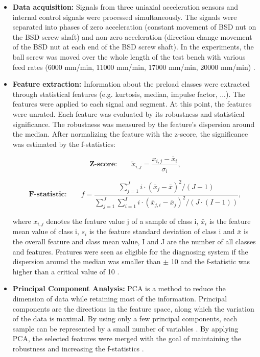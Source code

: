 \begin{itemize}
    \item \textbf{Data acquisition:} Signals from three uniaxial acceleration sensors and internal control signals were processed simultaneously. The signals were separated into phases of zero acceleration (constant movement of BSD nut on the BSD screw shaft) and non-zero acceleration (direction change movement of the BSD nut at each end of the BSD screw shaft). In the experiments, the ball screw was moved over the whole length of the test bench with various feed rates (6000 mm/min, 11000 mm/min, 17000 mm/min, 20000 mm/min) \cite{Denkena2021}.
    \item \textbf{Feature extraction:} Information about the preload classes were extracted through statistical features (e.g. kurtosis, median, impulse factor, ...). The features were applied to each signal and segment. At this point, the features were unrated. Each feature was evaluated by its robustness and statistical significance. The robustness was measured by the feature's dispersion around the median. After normalizing the feature with the z-score, the significance was estimated by the f-statistics:

    \begin{equation}
        \textbf{Z-score:}\qquad \tilde{x}_{i,j} = \frac{x_{i,j} - \bar x_{i}}{\sigma_{i}},
    \end{equation}
    
    \begin{equation}
        \textbf{F-statistic:}\qquad f = \frac{\sum_{j=1}^{J} i \cdot (\bar x_{j} -\bar x)^{2}/(J-1)}{\sum_{j=1}^{J} \sum_{i=1}^{I} i \cdot (\bar x_{j,i} -\bar x_{j})^{2}/(J \cdot (I-1))},
    \end{equation}

    
    where ${x}_{i,j}$ denotes the feature value j of a sample of class i, $\bar{x}_{i}$ is the feature mean value of class i, ${s}_{i}$ is the feature standard deviation of class i and $\bar{x}$ is the overall feature and class mean value, I and J are the number of all classes and features. Features were seen as eligible for the diagnosing system if the dispersion around the median was smaller than $\pm$ 10 and the f-statistic was higher than a critical value of 10 \cite{Denkena2021}. 
    
    \item \textbf{Principal Component Analysis:} 
    PCA is a method to reduce the dimension of data while retaining most of the information. Principal components are the directions in the feature space, along which the variation of the data is maximal. By using only a few principal components, each sample can be represented by a small number of variables \cite{Ringner2008}. By applying PCA, the selected features were merged with the goal of maintaining the robustness and increasing the f-statistics \cite{Denkena2021}.
    

\end{itemize}
